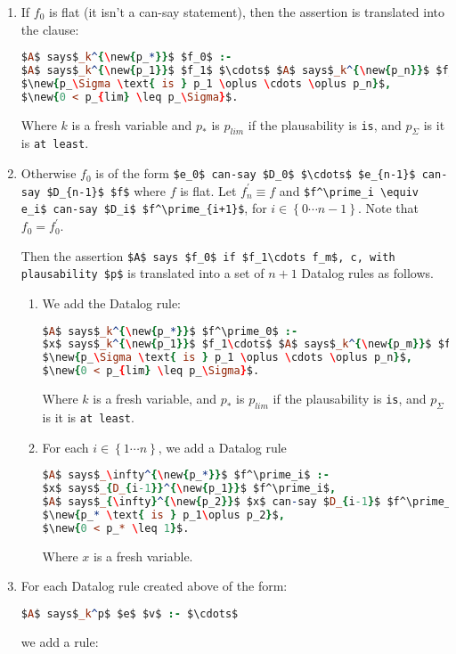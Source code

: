 \documentclass[a4paper]{scrartcl}
\newcommand{\new}[1]{{\color{BrickRed}#1}}
\begin{document}
\begin{enumerate}
\item
  If $f_0$ is flat (it isn't a can-say statement), then the assertion is translated into the clause:
  \begin{lstlisting}[language=Prolog]
$A$ says$_k^{\new{p_*}}$ $f_0$ :-
$A$ says$_k^{\new{p_1}}$ $f_1$ $\cdots$ $A$ says$_k^{\new{p_n}}$ $f_n$, c,
$\new{p_\Sigma \text{ is } p_1 \oplus \cdots \oplus p_n}$,
$\new{0 < p_{lim} \leq p_\Sigma}$.
  \end{lstlisting}
  Where $k$ is a fresh variable \new{and $p_*$ is $p_{lim}$ if the plausability is \texttt{is}, and $p_\Sigma$ is it is \texttt{at least}}.

\item
  Otherwise $f_0$ is of the form \lstinline!$e_0$ can-say $D_0$ $\cdots$ $e_{n-1}$ can-say $D_{n-1}$ $f$! where $f$ is flat.
  Let $f^\prime_n \equiv f$ and \lstinline!$f^\prime_i \equiv e_i$ can-say $D_i$ $f^\prime_{i+1}$!, for $i\in\left\{0\cdots n-1\right\}$.
  Note that $f_0 = f^\prime_0$.

  Then the assertion \lstinline!$A$ says $f_0$ if $f_1\cdots f_m$, c, with plausability $p$! is translated into a set of $n+1$ Datalog rules as follows.

  \begin{enumerate}
  \item
    We add the Datalog rule:
    \begin{lstlisting}[language=Prolog]
$A$ says$_k^{\new{p_*}}$ $f^\prime_0$ :-
$x$ says$_k^{\new{p_1}}$ $f_1\cdots$ $A$ says$_k^{\new{p_m}}$ $f_m$, c,
$\new{p_\Sigma \text{ is } p_1 \oplus \cdots \oplus p_n}$,
$\new{0 < p_{lim} \leq p_\Sigma}$.
    \end{lstlisting}
    Where $k$ is a fresh variable, \new{and $p_*$ is $p_{lim}$ if the plausability is \texttt{is}, and $p_\Sigma$ is it is \texttt{at least}}.

  \item
    For each $i\in\left\{1\cdots n\right\}$, we add a Datalog rule
    \begin{lstlisting}[language=Prolog]
$A$ says$_\infty^{\new{p_*}}$ $f^\prime_i$ :-
$x$ says$_{D_{i-1}}^{\new{p_1}}$ $f^\prime_i$,
$A$ says$_{\infty}^{\new{p_2}}$ $x$ can-say $D_{i-1}$ $f^\prime_i$,
$\new{p_* \text{ is } p_1\oplus p_2}$,
$\new{0 < p_* \leq 1}$.
    \end{lstlisting}
    Where $x$ is a fresh variable.
  \end{enumerate}

\item
  For each Datalog rule created above of the form:
  \begin{lstlisting}[language=Prolog]
$A$ says$_k^p$ $e$ $v$ :- $\cdots$
  \end{lstlisting}
  we add a rule:


\end{enumerate}
\end{document}

